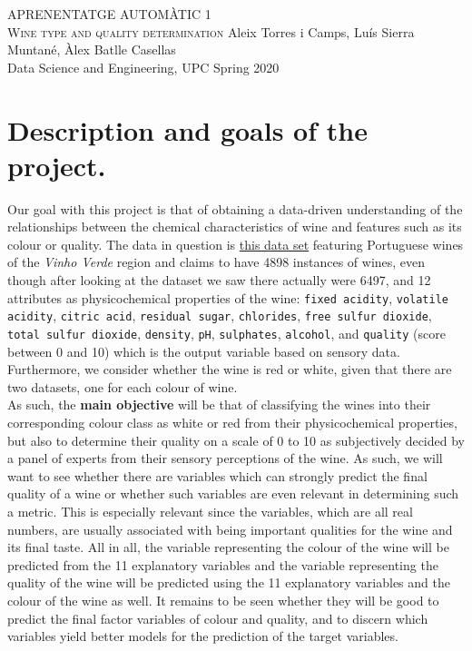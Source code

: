 \documentclass[10pt]{article}
\begin{document}
\begingroup
  \centering
  \LARGE APRENENTATGE AUTOMÀTIC 1\\
  \vskip 7cm
  \Huge  {\scshape Wine type and quality determination}
  \vskip 9cm
  \large {Aleix Torres i Camps, Luís Sierra Muntané, Àlex Batlle Casellas} \\
  \vskip 2cm
  \large {Data Science and Engineering, UPC Spring 2020}\\
[1.5em]
\endgroup
\newpage

\tableofcontents
\newpage

\section{Description and goals of the project.}
Our goal with this project is that of obtaining a data-driven understanding of the relationships between the chemical characteristics of wine and features such as its colour or quality. The data in question is \href{http://archive.ics.uci.edu/ml/datasets/Wine+Quality}{this data set} featuring Portuguese wines of the \textit{Vinho Verde} region and claims to have 4898 instances of wines, even though after looking at the dataset we saw there actually were 6497, and 12 attributes as physicochemical properties of the wine: \verb|fixed acidity|, \verb|volatile acidity|, \verb|citric acid|, \verb|residual sugar|, \verb|chlorides|, \verb|free sulfur dioxide|, \verb|total sulfur dioxide|, \verb|density|, \verb|pH|, \verb|sulphates|, \verb|alcohol|, and \verb|quality| (score between 0 and 10) which is the output variable based on sensory data.
Furthermore, we consider whether the wine is red or white, given that there are two datasets, one for each colour of wine. \\

As such, the \textbf{main objective} will be that of classifying the wines into their corresponding colour class as white or red from their physicochemical properties, but also to determine their quality on a scale of 0 to 10 as subjectively decided by a panel of experts from their sensory perceptions of the wine. As such, we will want to see whether there are variables which can strongly predict the final quality of a wine or whether such variables are even relevant in determining such a metric. This is especially relevant since the variables, which are all real numbers, are usually associated with being important qualities for the wine and its final taste. All in all, the variable representing the colour of the wine will be predicted from the 11 explanatory variables and the variable representing the quality of the wine will be predicted using the 11 explanatory variables and the colour of the wine as well. It remains to be seen whether they will be good to predict the final factor variables of colour and quality, and to discern which variables yield better models for the prediction of the target variables.
\end{document}
